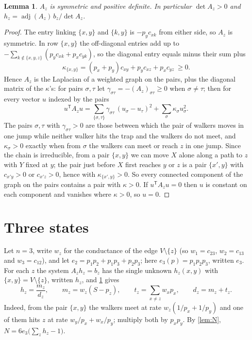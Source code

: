 \documentclass[11pt,a4paper]{article}
\numberwithin{equation}{section}
\newtheorem{lemma}[theorem]{Lemma}
\theoremstyle{remark}
\begin{document}
\begin{lemma}\label{lem:pd}
$A_z$ is symmetric and positive definite. In particular $\det A_z>0$ and $h_z=\operatorname{adj}(A_z)\,b_z/\det A_z$.
\end{lemma}

\begin{proof}
The entry linking $\{x,y\}$ and $\{k,y\}$ is $-p_yc_{xk}$ from either side, so $A_z$ is symmetric. In row $\{x,y\}$ the off-diagonal entries add up to $-\sum_{k\notin\{x,y,z\}}(p_yc_{xk}+p_xc_{yk})$, so the diagonal entry equals minus their sum plus
\[
\kappa_{\{x,y\}}=(p_x+p_y)c_{xy}+p_yc_{xz}+p_xc_{yz}\ \ge0.
\]
Hence $A_z$ is the Laplacian of a weighted graph on the pairs, plus the diagonal matrix of the $\kappa$'s: for pairs $\sigma,\tau$ let $\gamma_{\sigma\tau}=-(A_z)_{\sigma\tau}\ge0$ when $\sigma\ne\tau$; then for every vector $u$ indexed by the pairs
\[
u^{\mathsf T}A_zu=\sum_{\{\sigma,\tau\}}\gamma_{\sigma\tau}\,(u_\sigma-u_\tau)^2+\sum_\sigma\kappa_\sigma u_\sigma^2 .
\]
The pairs $\sigma,\tau$ with $\gamma_{\sigma\tau}>0$ are those between which the pair of walkers moves in one jump while neither walker hits the trap and the walkers do not meet, and $\kappa_\sigma>0$ exactly when from $\sigma$ the walkers can meet or reach $z$ in one jump. Since the chain is irreducible, from a pair $\{x,y\}$ we can move $X$ alone along a path to $z$ with $Y$ fixed at $y$; the pair just before $X$ first reaches $y$ or $z$ is a pair $\{x',y\}$ with $c_{x'y}>0$ or $c_{x'z}>0$, hence with $\kappa_{\{x',y\}}>0$. So every connected component of the graph on the pairs contains a pair with $\kappa>0$. If $u^{\mathsf T}A_zu=0$ then $u$ is constant on each component and vanishes where $\kappa>0$, so $u=0$.
\end{proof}

\section{Three states}\label{sec:three}

Let $n=3$, write $w_z$ for the conductance of the edge $V\setminus\{z\}$ (so $w_1=c_{23}$, $w_2=c_{13}$ and $w_3=c_{12}$), and let $e_2=p_1p_2+p_1p_3+p_2p_3$; here $e_3(p)=p_1p_2p_3$, written $e_3$. For each $z$ the system $A_zh_z=b_z$ has the single unknown $h_z(x,y)$ with $\{x,y\}=V\setminus\{z\}$, written $h_z$, and \cref{lem:pd} gives
\begin{equation}\label{eq:hz3}
h_z=\frac{m_z}{d_z},\qquad m_z=w_z(S-p_z),\qquad t_z=\sum_{x\ne z}w_xp_x,\qquad d_z=m_z+t_z .
\end{equation}
Indeed, from the pair $\{x,y\}$ the walkers meet at rate $w_z(1/p_x+1/p_y)$ and one of them hits $z$ at rate $w_y/p_x+w_x/p_y$; multiply both by $p_xp_y$. By \cref{lem:N}, $N=6e_3\bigl(\sum_zh_z-1\bigr)$.
\end{document}
